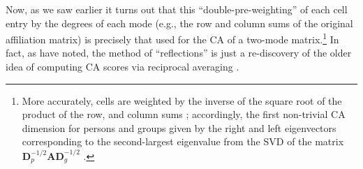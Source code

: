 \documentclass[a4paper,fleqn]{cas-sc}
\begin{document}
Now, as we saw earlier \citep[e.g.,][]{faust2005using} it turns out that this ``double-pre-weighting'' of each cell entry by the degrees of each mode (e.g., the row and column sums of the original affiliation matrix) is precisely that used for the CA of a two-mode matrix.\footnote{More accurately, cells are weighted by the inverse of the square root of the product of the row, and column sums \citep[e.g.,][124]{faust2005using}; accordingly, the first non-trivial CA dimension for persons and groups given by the right and left eigenvectors corresponding to the second-largest eigenvalue from the SVD of the matrix $\mathbf{D}_p^{-1/2}\mathbf{A}\mathbf{D}_g^{-1/2}$ \citep[126]{faust2005using}.} In fact, as \citet{mealy2019interpreting} have noted, the method of ``reflections'' is just a re-discovery of the older idea of computing CA scores via reciprocal averaging \citep{hill1973reciprocal}.
\end{document}
